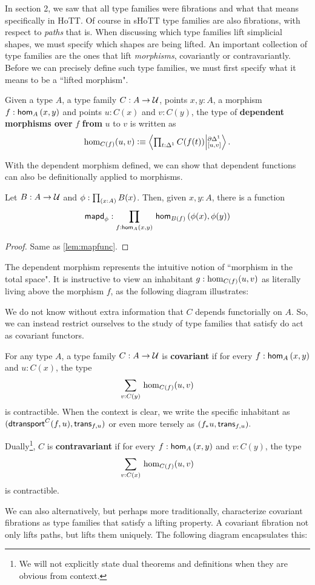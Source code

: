 \documentclass[main.tex]{subfiles}
\begin{document}
In section 2, we saw that all type families were fibrations and what that means specifically in HoTT. Of course in sHoTT type 
families are also fibrations, with respect to \textit{paths} that is. When discussing which type families lift simplicial shapes,
we must specify which shapes are being lifted. An important collection of type families are the ones that lift \textit{morphisms},
covariantly or contravariantly. Before we can precisely define such type families, we must first specify what it means to be a 
 ``lifted morphism".
\begin{definition}
Given a type $A$, a type family $C : A \to \U$, points $x,y : A$, a morphism $f : \ho[A]{x}{y}$ and points $u : C(x)$ and $v : C(y)$, the type of \textbf{dependent morphisms over} $f$ \textbf{from} $u$ to $v$ is written as $$
\dho{C}{f}{u}{v} \defeq \exten{t : \osx}{C(f(t))}{\pardo}{[u,v]}.$$
\end{definition}
With the dependent morphism defined, we can show that dependent functions can also be definitionally applied to morphisms.
\begin{lemma}
    Let $B : A \to \U$ and $\phi : \prd{x : A}B(x)$. Then, given $x,y : A$, there is a function
    $$\mapdepfunc{\phi} : \prd{f : \ho[A]{x}{y}}\ho[B(f)]{\phi(x)}{\phi(y)}$$
\end{lemma}
\begin{proof}
Same as \cref{lem:mapfunc}.
\end{proof}

The dependent morphism represents the intuitive notion of ``morphism in the total space". It is instructive to view an inhabitant $g :\dho{C}{f}{u}{v}$ as literally living above the morphism $f$, as the following diagram illustrates:

\begin{figure}[H]
    
\end{figure}

We do not know without extra information that $C$ depends functorially on $A$. So, we can instead restrict ourselves to the study of type families that satisfy do act as covariant functors.
\begin{definition}
For any type $A$, a type family $C : A \to \U$ is \textbf{covariant} if for every $f : \ho[A]{x}{y}$  and $u : C(x)$, the type $$\sm{v : C(y)} \dho{C}{f}{u}{v}$$
is contractible. When the context is clear, we write the specific inhabitant as $(\dtran{C}(f, u), \trans{f}{u})$ or 
even more tersely as $(f_*u, \trans{f}{u}).$

Dually\footnote{We will not explicitly state dual theorems and definitions when they are obvious from context.}, $C$ is \textbf{contravariant} if for every $f : \ho[A]{x}{y}$  and $v : C(y)$, the type $$\sm{v : C(x)} \dho{C}{f}{u}{v}$$
is contractible.
\end{definition}
We can also alternatively, but perhaps more traditionally, characterize covariant fibrations as type families that satisfy a lifting property. A covariant fibration not only lifts paths, but lifts them uniquely. The following diagram encapsulates this:
\end{document}
